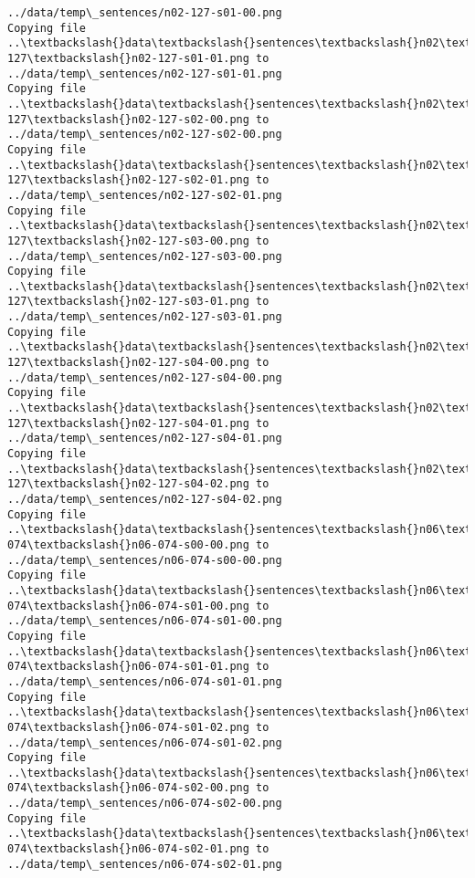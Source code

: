 \documentclass[11pt]{article}
\begin{document}
\begin{Verbatim}[commandchars=\\\{\}]
../data/temp\_sentences/n02-127-s01-00.png
Copying file ..\textbackslash{}data\textbackslash{}sentences\textbackslash{}n02\textbackslash{}n02-127\textbackslash{}n02-127-s01-01.png to
../data/temp\_sentences/n02-127-s01-01.png
Copying file ..\textbackslash{}data\textbackslash{}sentences\textbackslash{}n02\textbackslash{}n02-127\textbackslash{}n02-127-s02-00.png to
../data/temp\_sentences/n02-127-s02-00.png
Copying file ..\textbackslash{}data\textbackslash{}sentences\textbackslash{}n02\textbackslash{}n02-127\textbackslash{}n02-127-s02-01.png to
../data/temp\_sentences/n02-127-s02-01.png
Copying file ..\textbackslash{}data\textbackslash{}sentences\textbackslash{}n02\textbackslash{}n02-127\textbackslash{}n02-127-s03-00.png to
../data/temp\_sentences/n02-127-s03-00.png
Copying file ..\textbackslash{}data\textbackslash{}sentences\textbackslash{}n02\textbackslash{}n02-127\textbackslash{}n02-127-s03-01.png to
../data/temp\_sentences/n02-127-s03-01.png
Copying file ..\textbackslash{}data\textbackslash{}sentences\textbackslash{}n02\textbackslash{}n02-127\textbackslash{}n02-127-s04-00.png to
../data/temp\_sentences/n02-127-s04-00.png
Copying file ..\textbackslash{}data\textbackslash{}sentences\textbackslash{}n02\textbackslash{}n02-127\textbackslash{}n02-127-s04-01.png to
../data/temp\_sentences/n02-127-s04-01.png
Copying file ..\textbackslash{}data\textbackslash{}sentences\textbackslash{}n02\textbackslash{}n02-127\textbackslash{}n02-127-s04-02.png to
../data/temp\_sentences/n02-127-s04-02.png
Copying file ..\textbackslash{}data\textbackslash{}sentences\textbackslash{}n06\textbackslash{}n06-074\textbackslash{}n06-074-s00-00.png to
../data/temp\_sentences/n06-074-s00-00.png
Copying file ..\textbackslash{}data\textbackslash{}sentences\textbackslash{}n06\textbackslash{}n06-074\textbackslash{}n06-074-s01-00.png to
../data/temp\_sentences/n06-074-s01-00.png
Copying file ..\textbackslash{}data\textbackslash{}sentences\textbackslash{}n06\textbackslash{}n06-074\textbackslash{}n06-074-s01-01.png to
../data/temp\_sentences/n06-074-s01-01.png
Copying file ..\textbackslash{}data\textbackslash{}sentences\textbackslash{}n06\textbackslash{}n06-074\textbackslash{}n06-074-s01-02.png to
../data/temp\_sentences/n06-074-s01-02.png
Copying file ..\textbackslash{}data\textbackslash{}sentences\textbackslash{}n06\textbackslash{}n06-074\textbackslash{}n06-074-s02-00.png to
../data/temp\_sentences/n06-074-s02-00.png
Copying file ..\textbackslash{}data\textbackslash{}sentences\textbackslash{}n06\textbackslash{}n06-074\textbackslash{}n06-074-s02-01.png to
../data/temp\_sentences/n06-074-s02-01.png

\end{Verbatim}
\end{document}
